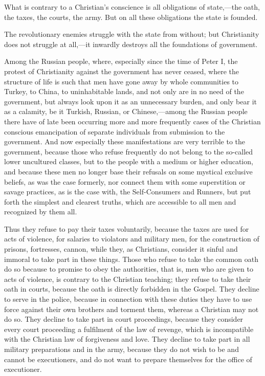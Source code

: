 \documentclass{book}
\begin{document}
What is contrary to a Christian’s conscience is all obligations of state,—the oath, the taxes, the courts, the army. But on all these obligations the state is founded.

The revolutionary enemies struggle with the state from without; but Christianity does not struggle at all,—it inwardly destroys all the foundations of government.

Among the Russian people, where, especially since the time of Peter I, the protest of Christianity against the government has never ceased, where the structure of life is such that men have gone away by whole communities to Turkey, to China, to uninhabitable lands, and not only are in no need of the government, but always look upon it as an unnecessary burden, and only bear it as a calamity, be it Turkish, Russian, or Chinese,—among the Russian people there have of late been occurring more and more frequently cases of the Christian conscious emancipation of separate individuals from submission to the government. And now especially these manifestations are very terrible to the government, because those who refuse frequently do not belong to the so-called lower uncultured classes, but to the people with a medium or higher education, and because these men no longer base their refusals on some mystical exclusive beliefs, as was the case formerly, nor connect them with some superstition or savage practices, as is the case with, the Self-Consumers and Runners, but put forth the simplest and clearest truths, which are accessible to all men and recognized by them all.

Thus they refuse to pay their taxes voluntarily, because the taxes are used for acts of violence, for salaries to violators and military men, for the construction of prisons, fortresses, cannon, while they, as Christians, consider it sinful and immoral to take part in these things. Those who refuse to take the common oath do so because to promise to obey the authorities, that is, men who are given to acts of violence, is contrary to the Christian teaching; they refuse to take their oath in courts, because the oath is directly forbidden in the Gospel. They decline to serve in the police, because in connection with these duties they have to use force against their own brothers and torment them, whereas a Christian may not do so. They decline to take part in court proceedings, because they consider every court proceeding a fulfilment of the law of revenge, which is incompatible with the Christian law of forgiveness and love. They decline to take part in all military preparations and in the army, because they do not wish to be and cannot be executioners, and do not want to prepare themselves for the office of executioner.
\end{document}
